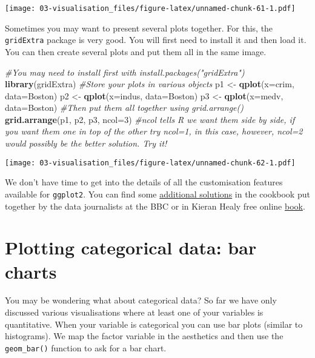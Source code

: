 \documentclass[
]{book}
\newenvironment{Shaded}{\begin{snugshade}}{\end{snugshade}}
\newcommand{\AttributeTok}[1]{\textcolor[rgb]{0.13,0.29,0.53}{#1}}
\newcommand{\CommentTok}[1]{\textcolor[rgb]{0.56,0.35,0.01}{\textit{#1}}}
\newcommand{\DecValTok}[1]{\textcolor[rgb]{0.00,0.00,0.81}{#1}}
\newcommand{\FunctionTok}[1]{\textcolor[rgb]{0.13,0.29,0.53}{\textbf{#1}}}
\newcommand{\NormalTok}[1]{#1}
\newcommand{\OtherTok}[1]{\textcolor[rgb]{0.56,0.35,0.01}{#1}}
\begin{document}
\texttt{[image: 03-visualisation\_files/figure-latex/unnamed-chunk-61-1.pdf]}

Sometimes you may want to present several plots together. For this, the \texttt{gridExtra} package is very good. You will first need to install it and then load it. You can then create several plots and put them all in the same image.

\begin{Shaded}
\begin{Highlighting}[]
\CommentTok{\#You may need to install first with install.packages("gridExtra")}
\FunctionTok{library}\NormalTok{(gridExtra)}
\CommentTok{\#Store your plots in various objects}
\NormalTok{p1 }\OtherTok{\textless{}{-}} \FunctionTok{qplot}\NormalTok{(}\AttributeTok{x=}\NormalTok{crim, }\AttributeTok{data=}\NormalTok{Boston)}
\NormalTok{p2 }\OtherTok{\textless{}{-}} \FunctionTok{qplot}\NormalTok{(}\AttributeTok{x=}\NormalTok{indus, }\AttributeTok{data=}\NormalTok{Boston)}
\NormalTok{p3 }\OtherTok{\textless{}{-}} \FunctionTok{qplot}\NormalTok{(}\AttributeTok{x=}\NormalTok{medv, }\AttributeTok{data=}\NormalTok{Boston)}
\CommentTok{\#Then put them all together using grid.arrange()}
\FunctionTok{grid.arrange}\NormalTok{(p1, p2, p3, }\AttributeTok{ncol=}\DecValTok{3}\NormalTok{) }\CommentTok{\#ncol tells R we want them side by side, if you want them one in top of the other try ncol=1, in this case, however, ncol=2 would possibly be the better solution. Try it!}
\end{Highlighting}
\end{Shaded}

\texttt{[image: 03-visualisation\_files/figure-latex/unnamed-chunk-62-1.pdf]}

We don't have time to get into the details of all the customisation features available for \texttt{ggplot2}. You can find some \href{https://bbc.github.io/rcookbook/}{additional solutions} in the cookbook put together by the data journalists at the BBC or in Kieran Healy free online \href{https://socviz.co/}{book}.

\section{Plotting categorical data: bar charts}\label{plotting-categorical-data-bar-charts}

You may be wondering what about categorical data? So far we have only discussed various visualisations where at least one of your variables is quantitative. When your variable is categorical you can use bar plots (similar to histograms). We map the factor variable in the aesthetics and then use the \texttt{geom\_bar()} function to ask for a bar chart.
\end{document}
